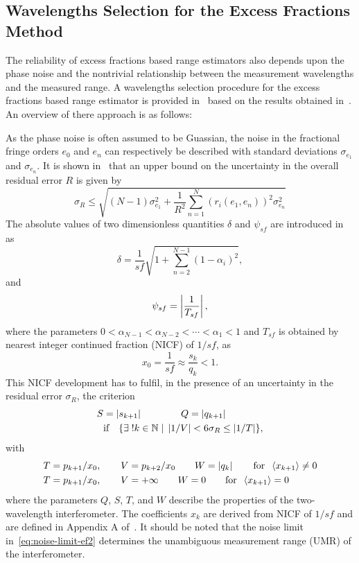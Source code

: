\subsection{Wavelengths Selection for the Excess Fractions Method}

The reliability of excess fractions based range estimators also depends upon the phase noise and the nontrivial relationship between the measurement wavelengths and the measured range. A wavelengths selection procedure for the excess fractions based range estimator is provided in~\cite{Falaggis_excess_fractions_2012} based on the results obtained in~\cite{Falaggis_excess_fractions_2011}. An overview of there approach is as follows:

As the phase noise is often assumed to be Guassian, the noise in the fractional fringe orders $e_0$ and $e_n$ can respectively be described with standard deviations $\sigma_{e_1}$ and $\sigma_{e_n}$. It is shown in~\cite{Falaggis_excess_fractions_2011} that an upper bound on the uncertainty in the overall residual error $R$ is given by
\begin{equation}\label{eq:noise-criterion-ef}
\sigma_R \leq \sqrt{   (N-1)\sigma_{e_1}^2 + \frac{1}{R^2} \sum_{n=1}^{N} (r_i(e_1, e_n))^2 \sigma_{e_n}^2      }
\end{equation}
The absolute values of two dimensionless quantities $\delta$ and $\psi_{sf}$ are introduced in~\cite{Falaggis_excess_fractions_2011, Falaggis_excess_fractions_2012} as
\[
\delta = \frac{1}{sf}\sqrt{1 + \sum_{n=2}^{N-1}(1 - \alpha_i)^2},
\]
and
\begin{equation}\label{eq:psi-NICF}
\psi_{sf} = \left\vert \frac{1}{T_{sf}} \right\vert,
\end{equation}
where the parameters $0 < \alpha_{N-1} < \alpha_{N-2} < \cdots < \alpha_1 < 1$ and $T_{sf}$ is obtained by nearest integer continued fraction (NICF) of $1/sf$, as
\[
x_0 = \frac{1}{sf} \approx \frac{s_k}{q_k} < 1.
\]
This NICF development has to fulfil, in the presence of an uncertainty in the residual error $\sigma_R$, the criterion~\cite{Falaggis_excess_fractions_2011, Falaggis_excess_fractions_2012}
\begin{align}
S &= \left\vert s_{k+1} \right\vert \qquad \qquad Q = \left\vert q_{k+1} \right\vert \label{eq:noise-limit-ef1} \\ 
&\text{if} \quad \{ \exists\; !k \in \mathbb{N} \;| \; \left\vert 1/V \right\vert < 6\sigma_R \leq \left\vert 1/T \right\vert \}, \label{eq:noise-limit-ef2}
\end{align}
with 
\begin{align}
T &= p_{k+1}/x_0, \qquad V = p_{k+2}/x_0 \qquad W = \left\vert q_k \right\vert \qquad \text{for}\;\; \left\langle x_{k+1} \right\rangle \neq 0 \\
T &= p_{k+1}/x_0, \qquad V = +\infty \qquad W = 0 \qquad \text{for}\;\; \left\langle x_{k+1} \right\rangle = 0
\end{align}
where the parameters $Q$, $S$, $T$, and $W$ describe the properties of the two-wavelength interferometer. The coefficients $x_k$ are derived from NICF of $1/sf$ and are defined in Appendix A of~\cite{Falaggis_excess_fractions_2011}. It should be noted that the noise limit  in~\ref{eq:noise-limit-ef2} determines the unambiguous measurement range (UMR) of the interferometer.

